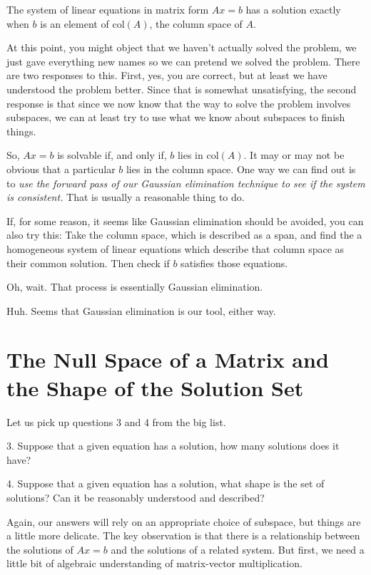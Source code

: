 \documentclass[00-livre-main.tex]{subfiles}
\begin{document}
\begin{theorem} The system of linear equations in matrix form $Ax=b$ has a solution exactly when $b$ is an element of $\mathrm{col}(A)$, the column space of $A$.
\end{theorem}

At this point, you might object that we haven't actually solved the problem, we just gave everything new names so we can pretend we solved the problem. There are two responses to this. First, yes, you are correct, but at least we have understood the problem better. Since that is somewhat unsatisfying, the second response is that since we now know that the way to solve the problem involves subspaces, we can at least try to use what we know about subspaces to finish things. 

So, $Ax=b$ is solvable if, and only if, $b$ lies in $\mathrm{col}(A)$. It may or may not be obvious that a particular $b$ lies in the column space. One way we can find out is to \emph{use the forward pass of our Gaussian elimination technique to see if the system is consistent.} That is usually a reasonable thing to do.

If, for some reason, it seems like Gaussian elimination should be avoided, you can also try this: Take the column space, which is described as a span, and find the a homogeneous system of linear equations which describe that column space as their common solution. Then check if $b$ satisfies those equations. 

Oh, wait. That process is essentially Gaussian elimination. 

Huh. Seems that Gaussian elimination is our tool, either way.


\section*{The Null Space of a Matrix and the Shape of the Solution Set}

Let us pick up questions 3 and 4 from the big list.
\begin{compactitem}
\item[3.] Suppose that a given equation has a solution, how many
solutions does it have?
\item[4.] Suppose that a given equation has a solution, what shape is
the set of solutions? Can it be reasonably understood and
described?
\end{compactitem}
Again, our answers will rely on an appropriate choice of subspace, but things are a little more delicate. The key observation is that there is a relationship between the solutions of $Ax=b$ and the solutions of a related system. But first, we need a little bit of algebraic understanding of matrix-vector multiplication.
\end{document}
